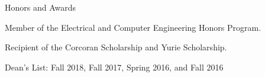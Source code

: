 \documentclass{resume} %
\begin{document}
\begin{rSection}{\small Honors and Awards}
\small %
\begin{rSubsection}{}{}{}{\em}
\item Member of the Electrical and Computer Engineering Honors Program.
\item Recipient of the Corcoran Scholarship and Yurie Scholarship.
\item Dean's List: Fall 2018, Fall 2017, Spring 2016, and Fall 2016
\end{rSubsection}

\end{rSection}
\end{document}
